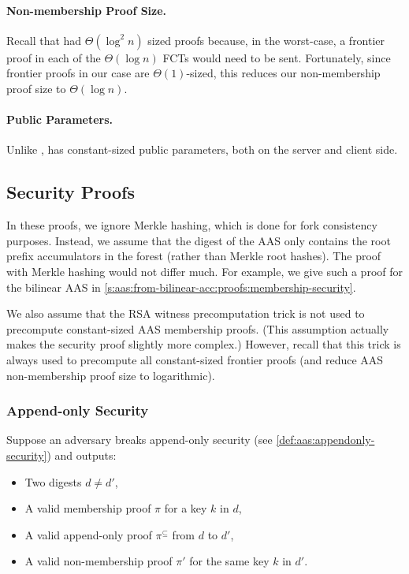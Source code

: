 \paragraph{Non-membership Proof Size.}
Recall that \biaas had $\Theta(\log^2{n})$ sized proofs because, in the worst-case, a frontier proof in each of the $\Theta(\log{n})$ FCTs would need to be sent.
Fortunately, since frontier proofs in our case are $\Theta(1)$-sized, this reduces our non-membership proof size to $\Theta(\log{n})$. 

\paragraph{Public Parameters.}
Unlike \biaas, \rsaaas has constant-sized public parameters, both on the server and client side.

\subsection{Security Proofs}
\label{s:aas:from-rsa-acc:proofs}

In these proofs, we ignore Merkle hashing, which is done for fork consistency purposes.
Instead, we assume that the digest of the AAS only contains the root prefix accumulators in the forest (rather than Merkle root hashes).
The proof with Merkle hashing would not differ much.
For example, we give such a proof for the bilinear AAS in \cref{s:aas:from-bilinear-acc:proofs:membership-security}.

We also assume that the RSA witness precomputation trick is not used to precompute constant-sized AAS membership proofs.
(This assumption actually makes the security proof slightly more complex.)
However, recall that this trick is always used to precompute all constant-sized frontier proofs (and reduce AAS non-membership proof size to logarithmic).

\subsubsection{Append-only Security}
\label{s:aas:from-rsa-acc:proofs:append-only-security}

Suppose an adversary \Adv breaks append-only security (see \cref{def:aas:appendonly-security}) and outputs:
\begin{itemize}
\item Two digests $d\ne d'$,
\item A valid membership proof $\pi$ for a key $k$ in $d$,
\item A valid append-only proof $\pi^\subseteq$ from $d$ to $d'$,
\item A valid non-membership proof $\pi'$ for the same key $k$ in $d'$.
\end{itemize}

